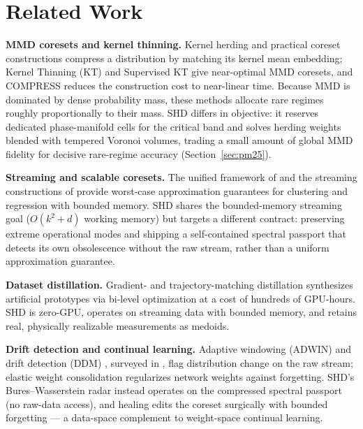 \documentclass[11pt,a4paper]{article}
\begin{document}
\section{Related Work}
\label{sec:related}

\textbf{MMD coresets and kernel thinning.} Kernel herding \citep{chen2010super} and practical coreset constructions \citep{bachem2017practical} compress a distribution by matching its kernel mean embedding; Kernel Thinning (KT) \citep{dwivedi2024kernel} and Supervised KT \citep{gong2024supervised} give near-optimal MMD coresets, and COMPRESS \citep{shetty2021compress} reduces the construction cost to near-linear time. Because MMD is dominated by dense probability mass, these methods allocate rare regimes roughly proportionally to their mass. SHD differs in objective: it reserves dedicated phase-manifold cells for the critical band and solves herding weights blended with tempered Voronoi volumes, trading a small amount of global MMD fidelity for decisive rare-regime accuracy (Section~\ref{sec:pm25}).

\textbf{Streaming and scalable coresets.} The unified framework of \citet{feldman2011unified} and the streaming constructions of \citet{braverman2016streaming} provide worst-case approximation guarantees for clustering and regression with bounded memory. SHD shares the bounded-memory streaming goal ($O(k^2 + d)$ working memory) but targets a different contract: preserving extreme operational modes and shipping a self-contained spectral passport that detects its own obsolescence without the raw stream, rather than a uniform approximation guarantee.

\textbf{Dataset distillation.} Gradient- and trajectory-matching distillation \citep{wang2018dataset} synthesizes artificial prototypes via bi-level optimization at a cost of hundreds of GPU-hours. SHD is zero-GPU, operates on streaming data with bounded memory, and retains real, physically realizable measurements as medoids.

\textbf{Drift detection and continual learning.} Adaptive windowing (ADWIN) \citep{bifet2007adwin} and drift detection (DDM) \citep{gama2004ddm}, surveyed in \citet{gama2014survey}, flag distribution change on the raw stream; elastic weight consolidation \citep{kirkpatrick2017overcoming} regularizes network weights against forgetting. SHD's Bures--Wasserstein radar instead operates on the compressed spectral passport (no raw-data access), and healing edits the coreset surgically with bounded forgetting --- a data-space complement to weight-space continual learning.
\end{document}
